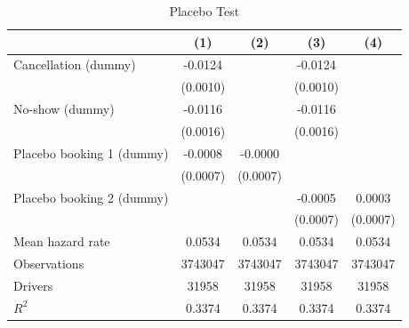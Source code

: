 \documentclass[reviewmode,AEJ]{AEA}
\begin{document}
\begin{table}[]
    \hfill


    \centering
    \footnotesize
    \caption{Placebo Test}
    \def\sym#1{}%
    \begin{tabularx}{\textwidth}{l@{\extracolsep{\fill}}*{4}{c}} 
        \toprule
        \toprule
                            &\multicolumn{1}{c}{(1)}         &\multicolumn{1}{c}{(2)}         &\multicolumn{1}{c}{(3)}         &\multicolumn{1}{c}{(4)}         \\
        \midrule
        Cancellation (dummy)&     -0.0124\sym{***}&                     &     -0.0124\sym{***}&                     \\
                            &    (0.0010)         &                     &    (0.0010)         &                     \\
        \addlinespace
        No-show (dummy)     &     -0.0116\sym{***}&                     &     -0.0116\sym{***}&                     \\
                            &    (0.0016)         &                     &    (0.0016)         &                     \\
        \addlinespace
        Placebo booking 1 (dummy)&     -0.0008         &     -0.0000         &                     &                     \\
                            &    (0.0007)         &    (0.0007)         &                     &                     \\
        \addlinespace
        Placebo booking 2 (dummy)&                     &                     &     -0.0005         &      0.0003         \\
                            &                     &                     &    (0.0007)         &    (0.0007)         \\
        \midrule
        Mean hazard rate    &      0.0534         &      0.0534         &       0.0534        &      0.0534         \\
        Observations        &     \num{3743047}   &     \num{3743047}   &     \num{3743047}   &     \num{3743047}   \\
        Drivers             &     \num{31958}     &      \num{31958}    &       \num{31958}   &       \num{31958}         \\
        \(R^2\)             &      0.3374         &      0.3374         &      0.3374         &      0.3374         \\
        \bottomrule

\end{tabularx}
\end{table}
\end{document}
